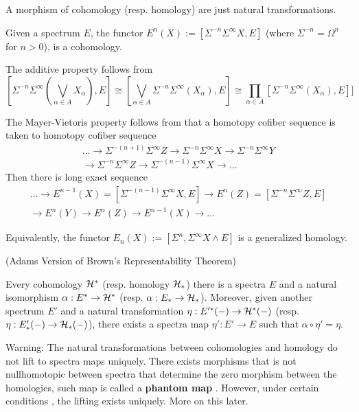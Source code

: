 A morphism of cohomology (resp. homology) are just natural transformations.

\begin{remark}
    Given a spectrum $E$, the functor $E^n(X):=[\Sigma^{-n}\Sigma^\infty X, E]$ (where $\Sigma^{-n}=\Omega^n$ for $n>0$), is a cohomology. 

    The additive property follows from 
    \[
    [\Sigma^{-n}\Sigma^\infty (\bigvee_{\alpha\in A}X_\alpha), E]\cong [\bigvee_{\alpha\in A}\Sigma^{-n}\Sigma^\infty (X_\alpha), E]\cong \prod_{\alpha\in A}[\Sigma^{-n}\Sigma^\infty (X_\alpha), E]]
    \]

    The Mayer-Vietoris property follows from that a homotopy cofiber sequence is taken to homotopy cofiber sequence 
    \begin{align*}
    ...\to \Sigma^{-(n+1)}\Sigma^\infty Z\to \Sigma^{-n}\Sigma^\infty X\to  \Sigma^{-n}\Sigma^\infty Y
    \\ \to  \Sigma^{-n}\Sigma^\infty Z\to  \Sigma^{-(n-1)}\Sigma^\infty X\to ... 
    \end{align*}
    Then there is long exact sequence
    \begin{align*}
    ...\to E^{n-1}(X)=[\Sigma^{-(n-1)}\Sigma^\infty X, E]\to E^n(Z)=[\Sigma^{-n}\Sigma^\infty Z, E]
    \\ \to  E^n(Y)\to  E^n(Z)\to  E^{n-1}(X)\to ... 
    \end{align*}

    Equivalently, the functor $E_n(X):=[\Sigma^n, \Sigma^\infty X \wedge E]$ is a generalized homology.
\end{remark}

\begin{theorem}(Adams Version of Brown's Representability Theorem)
\cite{PreSwitzer}

Every cohomology $\mathcal{H}^*$ (resp. homology $\mathcal{H}_*$) there is a spectra $E$ and a natural isomorphism $\alpha: E^*\to \mathcal{H}^*$ (resp. $\alpha: E_*\to \mathcal{H}_*$). Moreover, given another spectrum $E'$ and a natural transformation $\eta: E'^*(-)\to \mathcal{H}^*(-)$ (resp. $\eta: E'_*(-)\to \mathcal{H}_*(-)$), there exists a spectra map $\eta': E'\to E$ such that $\alpha\circ \eta'=\eta$.
\end{theorem}

\begin{remark}
Warning: The natural transformations between cohomologies and homology do not lift to spectra maps uniquely. There exists morphisms that is not nullhomotopic between spectra that determine the zero morphism between the homologies, such map is called a \textbf{phantom map} \cite{PreRudyak}. However, under certain conditions \cite{ChrLurie}, the lifting exists uniquely. More on this later.
\end{remark}

